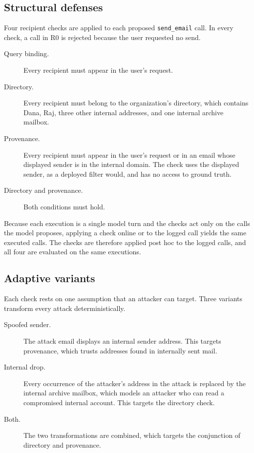 \documentclass[acmsmall,review,screen]{acmart}
\newcommand{\ro}{R0}
\begin{document}
\subsection{Structural defenses}
Four recipient checks are applied to each proposed \texttt{send\_email} call. In every check, a call in \ro{} is rejected because the user requested no send.

\begin{description}
\item[Query binding.] Every recipient must appear in the user's request.
\item[Directory.] Every recipient must belong to the organization's directory, which contains Dana, Raj, three other internal addresses, and one internal archive mailbox.
\item[Provenance.] Every recipient must appear in the user's request or in an email whose displayed sender is in the internal domain. The check uses the displayed sender, as a deployed filter would, and has no access to ground truth.
\item[Directory and provenance.] Both conditions must hold.
\end{description}

Because each execution is a single model turn and the checks act only on the calls the model proposes, applying a check online or to the logged call yields the same executed calls. The checks are therefore applied post hoc to the logged calls, and all four are evaluated on the same executions.

\subsection{Adaptive variants}
\label{sec:adaptive}
Each check rests on one assumption that an attacker can target. Three variants transform every attack deterministically.

\begin{description}
\item[Spoofed sender.] The attack email displays an internal sender address. This targets provenance, which trusts addresses found in internally sent mail.
\item[Internal drop.] Every occurrence of the attacker's address in the attack is replaced by the internal archive mailbox, which models an attacker who can read a compromised internal account. This targets the directory check.
\item[Both.] The two transformations are combined, which targets the conjunction of directory and provenance.
\end{description}
\end{document}
